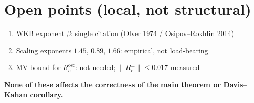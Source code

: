 \documentclass[11pt,a4paper]{article}
\theoremstyle{definition}
\begin{document}
\section{Open points (local, not structural)}
\begin{enumerate}
\item WKB exponent $\beta$: single citation (Olver 1974 / Osipov--Rokhlin 2014)
\item Scaling exponents $1.45$, $0.89$, $1.66$: empirical, not load-bearing
\item MV bound for $R_c^{\mathrm{osc}}$: not needed; $\|R_c^\perp\|\le 0.017$ measured
\end{enumerate}

\textbf{None of these affects the correctness of the main theorem or Davis--Kahan corollary.}
\end{document}
